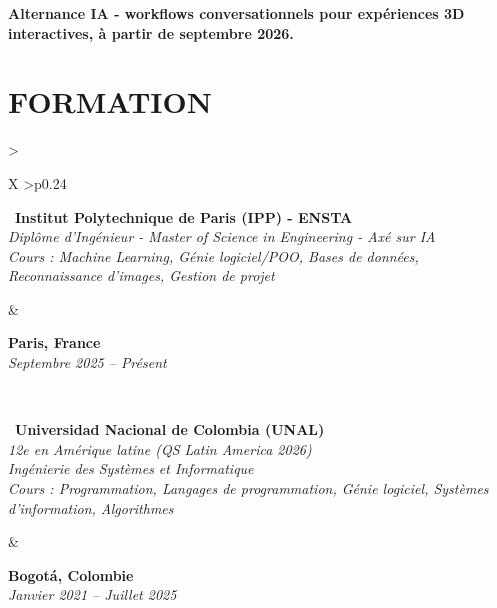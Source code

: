 \documentclass[letterpaper,10pt]{article}
\begin{document}
\textbf{Alternance IA - workflows conversationnels pour expériences 3D interactives, à partir de septembre 2026.} 


\vspace{0.08cm}

\section{\textcolor{mydarkgreen}{\textbf{FORMATION}}}

\begin{tabularx}{\textwidth}{>{\raggedright\arraybackslash}X >{\raggedleft\arraybackslash}p{0.24\textwidth}}
  \begin{minipage}[t]{\linewidth}\raggedright
  \textbullet\ \textbf{Institut Polytechnique de Paris (IPP) - ENSTA}\\
  \textit{\footnotesize Diplôme d'Ingénieur - Master of Science in Engineering - Axé sur IA}\\
  \textit{\footnotesize Cours : Machine Learning, Génie logiciel/POO, Bases de données, Reconnaissance d'images, Gestion de projet}
  \end{minipage}
  &
  \begin{minipage}[t]{\linewidth}\raggedleft
  \textbf{Paris, France}\\
  {\footnotesize\textit{Septembre 2025 -- Présent}}
  \end{minipage}
  \\
  \begin{minipage}[t]{\linewidth}
  \textbullet\ \textbf{Universidad Nacional de Colombia (UNAL)}\\
  \textit{\footnotesize 12e en Amérique latine (QS Latin America 2026)}\\
  \textit{\footnotesize Ingénierie des Systèmes et Informatique}\\
  \textit{\footnotesize Cours : Programmation, Langages de programmation, Génie logiciel, Systèmes d'information, Algorithmes}
  \end{minipage}
  &
  \begin{minipage}[t]{\linewidth}\raggedleft
  \textbf{Bogotá, Colombie}\\
  {\footnotesize\textit{Janvier 2021 -- Juillet 2025}}
  \end{minipage}

\end{tabularx}
\end{document}
